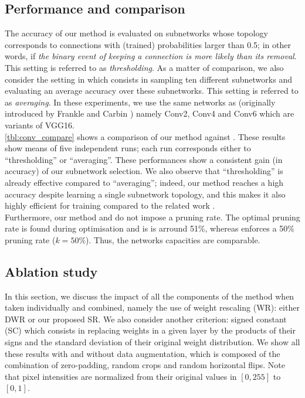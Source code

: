     

\subsection{Performance and comparison}

The accuracy of our method is evaluated on subnetworks whose topology
corresponds to connections with  (trained) probabilities larger than 0.5;  in
other words,  if {\it the binary event of keeping a connection is more likely
than its removal}.  This setting is referred to as  {\it thresholding}.  As a
matter of comparison,  we also consider the setting in
\cite{DBLP:conf/nips/ZhouLLY19} which consists in sampling ten different
subnetworks and evaluating an average accuracy over  these subnetworks.  This
setting  is referred to as {\it averaging}.  In these experiments,  we use the
same networks as
\cite{DBLP:conf/nips/ZhouLLY19,DBLP:conf/cvpr/RamanujanWKFR20} (originally
introduced by  Frankle and Carbin \cite{DBLP:conf/iclr/FrankleC19}) namely
Conv2,  Conv4 and Conv6 which are  variants of  VGG16. \\
\indent   \cref{tbl:conv_compare}  shows a comparison of our method against
\cite{DBLP:conf/nips/ZhouLLY19,DBLP:conf/cvpr/RamanujanWKFR20}.    These
results show means of five independent runs; each run corresponds either to
``thresholding'' or ``averaging''.  These performances show a consistent gain
(in accuracy) of our subnetwork selection.   We also observe that
``thresholding'' is already effective compared to ``averaging''; indeed, our
method reaches a  high accuracy despite learning a single subnetwork topology,
and this makes it also highly efficient for training compared to  the related
work \cite{DBLP:conf/nips/ZhouLLY19,DBLP:conf/cvpr/RamanujanWKFR20}.\\ 
\indent Furthermore, our method and \cite{DBLP:conf/nips/ZhouLLY19} do not
impose a pruning rate. The optimal pruning rate is found during optimisation and
is is arround 51\%, whereas \cite{DBLP:conf/cvpr/RamanujanWKFR20} enforces a 50\%
pruning rate ($k=50\%$). Thus, the networks capacities
are comparable. \\


  \subsection{Ablation study}
  In this section, we discuss the impact of all the components of the method
  when taken individually and combined,  namely the use of weight rescaling
  (WR): either DWR or our proposed SR.   We also consider another criterion:
  signed constant  (SC) which consists in replacing weights in a given layer by
  the products of their signs and the standard deviation of their original
  weight distribution.  We show  all these results with and without data
  augmentation, which is composed of the combination of zero-padding,  random crops and
  random  horizontal flips.   Note that  pixel intensities are normalized  from
  their original values in $[0,255]$ to $[0,1]$.
    
